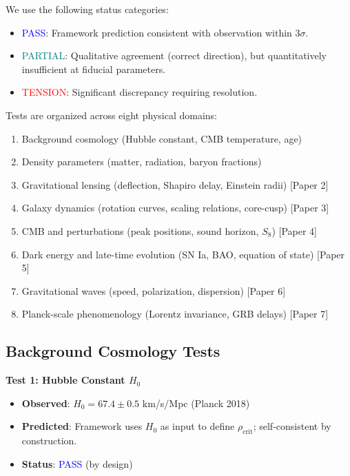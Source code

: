 \documentclass[11pt,a4paper]{article}
\newcommand{\rhocrit}{\ensuremath{\rho_{\mathrm{crit}}}}
\theoremstyle{definition}
\theoremstyle{remark}
\begin{document}
We use the following status categories:
\begin{itemize}[leftmargin=*, itemsep=0.2em]
\item \textcolor{blue}{PASS}: Framework prediction consistent with observation within $3\sigma$.
\item \textcolor{teal}{PARTIAL}: Qualitative agreement (correct direction), but quantitatively insufficient at fiducial parameters.
\item \textcolor{red}{TENSION}: Significant discrepancy requiring resolution.
\end{itemize}

Tests are organized across eight physical domains:
\begin{enumerate}[label=\Alph*., leftmargin=*]
\item Background cosmology (Hubble constant, CMB temperature, age)
\item Density parameters (matter, radiation, baryon fractions)
\item Gravitational lensing (deflection, Shapiro delay, Einstein radii) [Paper 2]
\item Galaxy dynamics (rotation curves, scaling relations, core-cusp) [Paper 3]
\item CMB and perturbations (peak positions, sound horizon, $S_8$) [Paper 4]
\item Dark energy and late-time evolution (SN Ia, BAO, equation of state) [Paper 5]
\item Gravitational waves (speed, polarization, dispersion) [Paper 6]
\item Planck-scale phenomenology (Lorentz invariance, GRB delays) [Paper 7]
\end{enumerate}

\subsection{Background Cosmology Tests}
\label{sec:tests_background}

\textbf{Test 1: Hubble Constant $H_0$}

\begin{itemize}[leftmargin=*, itemsep=0.1em]
\item \textbf{Observed}: $H_0 = 67.4 \pm 0.5$ km/s/Mpc (Planck 2018) \cite{Planck2018}
\item \textbf{Predicted}: Framework uses $H_0$ as input to define $\rhocrit$; self-consistent by construction.
\item \textbf{Status}: \textcolor{blue}{PASS} (by design)
\end{itemize}
\end{document}
